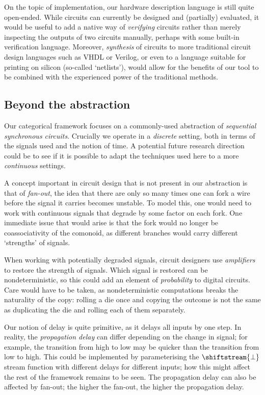 On the topic of implementation, our hardware description language is still
quite open-ended.
While circuits can currently be designed and (partially) evaluated, it would be
useful to add a native way of \emph{verifying} circuits rather than merely
inspecting the outputs of two circuits manually, perhaps with some built-in
verification language.
Moreover, \emph{synthesis} of circuits to more traditional circuit design
languages such as VHDL or Verilog, or even to a language suitable for printing
on silicon (so-called `netlists'), would allow for the benefits of our tool to
be combined with the experienced power of the traditional methods.

\subsection{Beyond the abstraction}

Our categorical framework focuses on a commonly-used abstraction
of \emph{sequential synchronous circuits}.
Crucially we operate in a \emph{discrete} setting, both in terms of the signals
used and the notion of time.
A potential future research direction could be to see if it is possible to adapt
the techniques used here to a more \emph{continuous} settings.

A concept important in circuit design that is not present in our abstraction is
that of \emph{fan-out}, the idea that there are only so many times one can fork
a wire before the signal it carries becomes unstable.
To model this, one would need to work with continuous signals that degrade by
some factor on each fork.
One immediate issue that would arise is that the fork would no longer be
coassociativity of the comonoid, as different branches would carry different
`strengths' of signals.

When working with potentially degraded signals, circuit designers use
\emph{amplifiers} to restore the strength of signals.
Which signal is restored can be nondeterministic, so this could add an element
of \emph{probability} to digital circuits.
Care would have to be taken, as nondeterministic computations breaks the
naturality of the copy: rolling a die once and copying the outcome is not the
same as duplicating the die and rolling each of them separately.

Our notion of delay is quite primitive, as it delays all inputs by one step.
In reality, the \emph{propagation delay} can differ depending on the change in
signal; for example, the transition from high to low may be quicker than the
transition from low to high.
This could be implemented by parameterising the \(\shiftstream{\bot}\) stream
function with different delays for different inputs; how this might affect the
rest of the framework remains to be seen.
The propagation delay can also be affected by fan-out; the higher the fan-out,
the higher the propagation delay.

